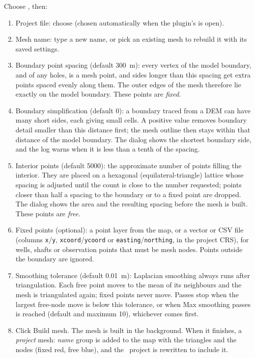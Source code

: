         Choose , then:
        \begin{enumerate}
        \item {\sf Project file}: choose  (chosen automatically when the plugin's  is open).
        \item {\sf Mesh name}: type a new name, or pick an existing mesh to rebuild it with its saved settings.
        \item {\sf Boundary point spacing} (default 300~m): every vertex of the model boundary, and of any holes, is a mesh point, and sides longer than this spacing get extra points spaced evenly along them.  The outer edges of the mesh therefore lie exactly on the model boundary.  These points are {\em fixed}.
        \item {\sf Boundary simplification} (default 0): a boundary traced from a DEM can have many short sides, each giving small cells.  A positive value removes boundary detail smaller than this distance first; the mesh outline then stays within that distance of the model boundary.  The dialog shows the shortest boundary side, and the log warns when it is less than a tenth of the spacing.
        \item {\sf Interior points} (default 5000): the approximate number of points filling the interior.  They are placed on a hexagonal (equilateral-triangle) lattice whose spacing is adjusted until the count is close to the number requested; points closer than half a spacing to the boundary or to a fixed point are dropped.  The dialog shows the area and the resulting spacing before the mesh is built.  These points are {\em free}.
        \item {\sf Fixed points} (optional): a point layer from the map, or a vector or CSV file (columns {\tt x}/{\tt y}, {\tt xcoord}/{\tt ycoord} or {\tt easting}/{\tt northing}, in the project CRS), for wells, shafts or observation points that must be mesh nodes.  Points outside the boundary are ignored.
        \item {\sf Smoothing tolerance} (default 0.01~m): Laplacian smoothing always runs after triangulation.  Each free point moves to the mean of its neighbours and the mesh is triangulated again; fixed points never move.  Passes stop when the largest free-node move is below this tolerance, or when {\sf Max smoothing passes} is reached (default and maximum 10), whichever comes first.
        \item Click {\sf Build mesh}.  The mesh is built in the background.  When it finishes, a {\sf \textit{project} mesh: \textit{name}} group is added to the map with the triangles and the nodes (fixed red, free blue), and the \qgis\ project is rewritten to include it.
        \end{enumerate}

